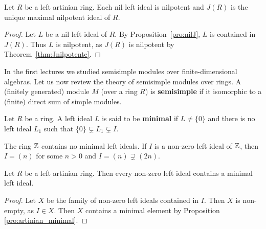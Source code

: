 \begin{corollary}
	Let $R$ be a left artinian ring. Each nil left ideal is nilpotent and 
	$J(R)$ is the unique maximal nilpotent ideal of $R$. 
\end{corollary}

\begin{proof}
	Let $L$ be a nil left ideal of $R$. By Proposition~\ref{pro:nilJ}, $L$
	is contained in $J(R)$. Thus $L$ is nilpotent, as $J(R)$ 
	is nilpotent by Theorem~\ref{thm:Jnilpotente}. 
\end{proof}



In the first lectures we studied semisimple modules over finite-dimensional 
algebras. Let us now review the theory of semisimple modules over rings. 
A (finitely generated) module $M$ (over a ring $R$) is \textbf{semisimple} 
if it isomorphic to a (finite) direct sum of simple modules. 

\begin{definition}
    Let $R$ be a ring. A left ideal $L$ is said to be \textbf{minimal}
    if $L\ne\{0\}$ and there is no left ideal $L_1$
    such that $\{0\}\subsetneq L_1\subsetneq I$.
\end{definition}

The ring $\mathbb{Z}$ contains no minimal left ideals. If $I$ is a non-zero 
left ideal of $\mathbb{Z}$, then
$I=(n)$ for some $n>0$ and $I=(n)\supsetneq (2n)$. 

\begin{proposition}
    Let $R$ be a left artinian ring. 
    Then every non-zero left ideal contains a minimal left ideal. 
\end{proposition}

\begin{proof}
    Let $X$ be the family of non-zero left ideals contained in $I$. Then $X$ is non-empty, as 
    $I\in X$. Then $X$ contains a minimal element by Proposition \ref{pro:artinian_minimal}. 
\end{proof}


